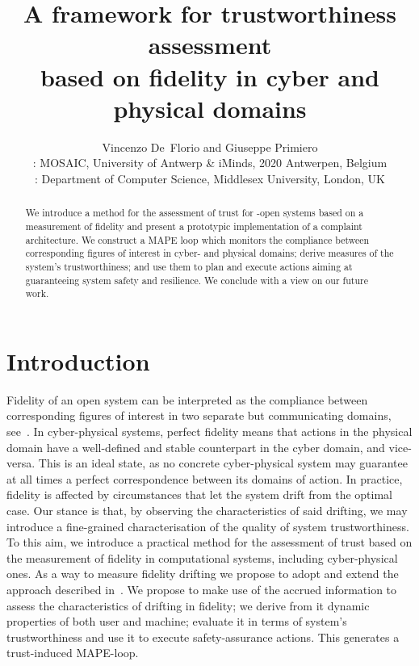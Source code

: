 \documentclass{article}
\begin{document}
\title{A framework for trustworthiness assessment\\based on fidelity in cyber and physical domains}





\author{Vincenzo De~Florio and Giuseppe Primiero\\
: MOSAIC, University of Antwerp \& iMinds, 2020 Antwerpen, Belgium\\
: Department of Computer Science, Middlesex University, London, UK}












\maketitle
\begin{abstract}
We introduce a method for the assessment of trust for -open systems based on a measurement of fidelity and present a prototypic implementation of a complaint architecture. We construct a MAPE loop which monitors the compliance between corresponding figures of interest in cyber- and physical domains; derive measures of the system's trustworthiness; and use them to plan and execute actions aiming at guaranteeing system safety and resilience. We conclude with a view on our future work.
\end{abstract}





\section{Introduction}\label{intro}

Fidelity of an open system can be interpreted as the compliance between corresponding figures of interest in two separate but communicating domains, see~\cite{DF14a}. 
In cyber-physical systems, perfect fidelity means that actions in the physical domain 
have a well-defined and stable counterpart in the cyber domain, and vice-versa. This is an ideal state,
as no concrete cyber-physical system may guarantee at all times a perfect correspondence between its domains of action. In practice, fidelity is affected by circumstances that let the system drift from the optimal case.
Our stance is that, by observing the characteristics of said drifting, we may introduce a fine-grained characterisation of the quality of system trustworthiness. 
To this aim, we introduce a practical method for the assessment of trust based on the measurement of fidelity in computational systems, including cyber-physical ones. As a way to measure fidelity drifting we propose to adopt and extend the approach described in~\cite{DFB12b,DB07a}.
We propose to make use of the accrued information to assess the characteristics of drifting in fidelity; we derive from it dynamic properties of both user and machine; evaluate it in terms of system's trustworthiness and use it to execute safety-assurance actions. This generates a trust-induced MAPE-loop.
\end{document}
